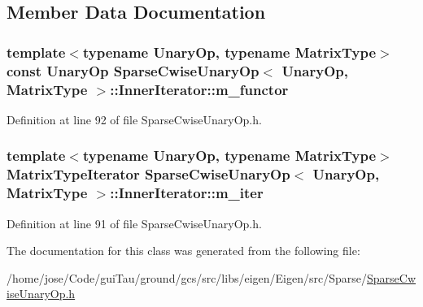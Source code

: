\subsection{Member Data Documentation}
\hypertarget{class_sparse_cwise_unary_op_1_1_inner_iterator_a2a24282b74c70983989a7afe4b408a2f}{
\subsubsection[{m\-\_\-functor}]{\setlength{\rightskip}{0pt plus 5cm}template$<$typename Unary\-Op, typename Matrix\-Type$>$ const Unary\-Op {\bf Sparse\-Cwise\-Unary\-Op}$<$ Unary\-Op, Matrix\-Type $>$\-::Inner\-Iterator\-::m\-\_\-functor\hspace{0.3cm}{\ttfamily [protected]}}}\label{class_sparse_cwise_unary_op_1_1_inner_iterator_a2a24282b74c70983989a7afe4b408a2f}


Definition at line 92 of file Sparse\-Cwise\-Unary\-Op.\-h.

\hypertarget{class_sparse_cwise_unary_op_1_1_inner_iterator_a0b7ca4bcd6452664c580d1245bf8aa4e}{
\subsubsection[{m\-\_\-iter}]{\setlength{\rightskip}{0pt plus 5cm}template$<$typename Unary\-Op, typename Matrix\-Type$>$ Matrix\-Type\-Iterator {\bf Sparse\-Cwise\-Unary\-Op}$<$ Unary\-Op, Matrix\-Type $>$\-::Inner\-Iterator\-::m\-\_\-iter\hspace{0.3cm}{\ttfamily [protected]}}}\label{class_sparse_cwise_unary_op_1_1_inner_iterator_a0b7ca4bcd6452664c580d1245bf8aa4e}


Definition at line 91 of file Sparse\-Cwise\-Unary\-Op.\-h.



The documentation for this class was generated from the following file\-:\begin{DoxyCompactItemize}
\item 
/home/jose/\-Code/gui\-Tau/ground/gcs/src/libs/eigen/\-Eigen/src/\-Sparse/\hyperlink{_sparse_cwise_unary_op_8h}{Sparse\-Cwise\-Unary\-Op.\-h}\end{DoxyCompactItemize}
